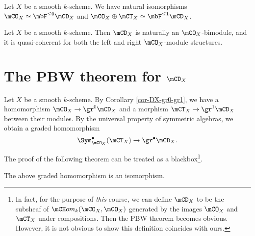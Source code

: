 	\begin{cor}
		\label{cor-DX-gr0-gr1}
		Let $X$ be a smooth $k$-scheme. We have natural isomorphisms $\mCO_X \simeq \mbF^{\le 0} \mCD_X$ and $\mCO_X\oplus \mCT_X \simeq \mbF^{\le 1} \mCD_X$.
	\end{cor}

	\begin{cor}
		Let $X$ be a smooth $k$-scheme. Then $\mCD_X$ is naturally an $\mCO_X$-bimodule, and it is quasi-coherent for both the left and right $\mCO_X$-module structures.
	\end{cor}

\section{The PBW theorem for \texorpdfstring{$\mCD_X$}{DX}}

	
	\begin{constr}
		Let $X$ be a smooth $k$-scheme. By Corollary \ref{cor-DX-gr0-gr1}, we have a homomorphism $\mCO_X \to \gr^0 \mCD_X$ and a morphism $\mCT_X \to \gr^1 \mCD_X$ between their modules. By the universal property of symmetric algebras, we obtain a graded homomorphism
		\begin{equation}
			\label{eqn-PBW-diff}
			\Sym^\bullet_{\mCO_X} (\mCT_X) \to \gr^\bullet \mCD_X.
		\end{equation}
	\end{constr}
	
	The proof of the following theorem can be treated as a blackbox\footnote{In fact, for the purpose of \emph{this} course, we can define $\mCD_X$ to be the subsheaf of $\mCH om_k(\mCO_X,\mCO_X)$ generated by the images $\mCO_X$ and $\mCT_X$ under compositions. Then the PBW theorem becomes obvious. However, it is not obvious to show this definition coincides with ours.}.

	\begin{thm}
		The above graded homomorphism is an isomorphism.
	\end{thm}

	\proof

